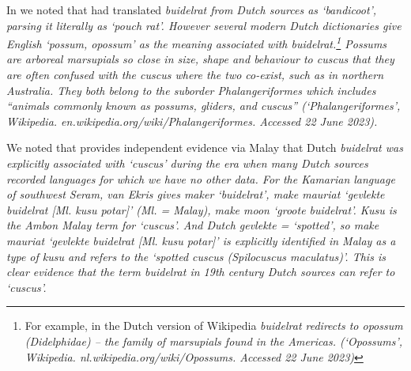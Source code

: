 In  we noted that \citet{Blust1982,Blust2012b}
had translated \it{buidelrat} from Dutch sources as ‘bandicoot’,
parsing it literally as ‘pouch rat’.
However several modern Dutch dictionaries give English ‘possum,
opossum’ as the meaning associated with \it{buidelrat}.\footnote{
		For example, in the Dutch version of Wikipedia \it{buidelrat} redirects to
		\it{opossum} (Didelphidae) -- the family of marsupials found
		in the Americas. (‘Opossums’, Wikipedia. nl.wikipedia.org/wiki/Opossums.
		Accessed 22 June 2023)}
Possums are arboreal marsupials so close
in size, shape and behaviour to cuscus that they are often confused with
the cuscus where the two co-exist,
such as in northern Australia.
They both belong to the suborder Phalangeriformes which includes
“animals commonly known as possums,
gliders, and cuscus” (`Phalangeriformes', Wikipedia. en.wikipedia.org/wiki/Phalangeriformes.
Accessed 22 June 2023).

We noted that \citet[304--305]{vanEkris1864} provides independent
evidence via Malay that Dutch \it{buidelrat} was explicitly associated
with ‘cuscus’ during the era when many Dutch sources recorded
languages for which we have no other data.
For the Kamarian language of southwest Seram,
van Ekris gives \it{maker} ‘buidelrat’,
\it{make mauriat} ‘gevlekte buidelrat [Ml.
kusu potar]’ (Ml. = Malay), \it{make moon} ‘groote buidelrat’.
\it{Kusu} is the Ambon Malay term for ‘cuscus’.
And Dutch \it{gevlekte} = ‘spotted’,
so \it{make mauriat} ‘gevlekte buidelrat [Ml.
kusu potar]’ is explicitly identified in Malay as a type of \it{kusu}
and refers to the ‘spotted cuscus (\it{Spilocuscus maculatus})’.
This is clear evidence that the term \it{buidelrat} in 19th century
Dutch sources can refer to ‘cuscus’.

